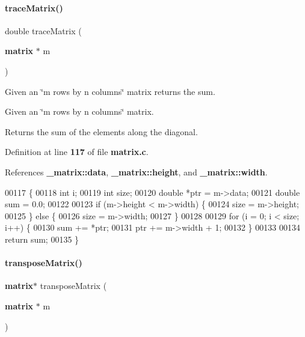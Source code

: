 \paragraph{trace\+Matrix()}
{\footnotesize\ttfamily double trace\+Matrix (\begin{DoxyParamCaption}\item[{\textbf{ matrix} $\ast$}]{m }\end{DoxyParamCaption})}



Given an \char`\"{}m rows by n columns\char`\"{} matrix returns the sum. 

Given an \char`\"{}m rows by n columns\char`\"{} matrix.

\begin{DoxyReturn}{Returns}
the sum of the elements along the diagonal. 
\end{DoxyReturn}


Definition at line \textbf{ 117} of file \textbf{ matrix.\+c}.



References \textbf{ \+\_\+matrix\+::data}, \textbf{ \+\_\+matrix\+::height}, and \textbf{ \+\_\+matrix\+::width}.


\begin{DoxyCode}
00117                               \{
00118   \textcolor{keywordtype}{int} i;
00119   \textcolor{keywordtype}{int} size;
00120   \textcolor{keywordtype}{double} *ptr = m->data;
00121   \textcolor{keywordtype}{double} sum = 0.0;
00122 
00123   \textcolor{keywordflow}{if} (m->height < m->width) \{
00124     size = m->height;
00125   \} \textcolor{keywordflow}{else} \{
00126     size = m->width;
00127   \}
00128 
00129   \textcolor{keywordflow}{for} (i = 0; i < size; i++) \{
00130     sum += *ptr;
00131     ptr += m->width + 1;
00132   \}
00133 
00134   \textcolor{keywordflow}{return} sum;
00135 \}
\end{DoxyCode}
\mbox{\label{matrix_8c_a2936260302742748b0639e8ec71d4d9f}} 
\paragraph{transpose\+Matrix()}
{\footnotesize\ttfamily \textbf{ matrix}$\ast$ transpose\+Matrix (\begin{DoxyParamCaption}\item[{\textbf{ matrix} $\ast$}]{m }\end{DoxyParamCaption})}



